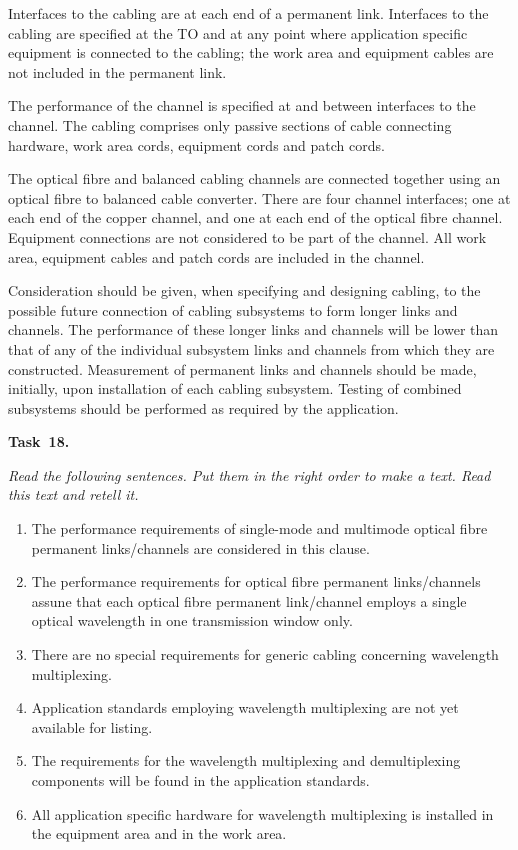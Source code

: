 Interfaces to the cabling are at each end of a permanent link. Interfaces to the cabling are
specified at the TO and at any point where application specific equipment is connected to the
cabling; the work area and equipment cables are not included in the permanent link.\par

The performance of the channel is specified at and between interfaces to the channel. The
cabling comprises only passive sections of cable connecting hardware, work area cords, equipment
cords and patch cords.\par

The optical fibre and balanced cabling channels are connected together using an optical fibre to
balanced cable converter. There are four channel interfaces; one at each end of the copper channel,
and one at each end of the optical fibre channel. Equipment connections are not considered to be
part of the channel. All work area, equipment cables and patch cords are included in the channel.\par

Consideration should be given, when specifying and designing cabling, to the possible future
connection of cabling subsystems to form longer links and channels. The performance of these
longer links and channels will be lower than that of any of the individual subsystem links and
channels from which they are constructed. Measurement of permanent links and channels should be
made, initially, upon installation of each cabling subsystem. Testing of combined subsystems
should be performed as required by the application.\par

{\bf Task~18.}~~{\it Read the following sentences. Put them in the right order to make a text.
Read this text and retell it. \par}

\begin{enumerate}
    \item {The performance requirements of single-mode and multimode optical fibre permanent 
    links/channels are considered in this clause.}
    \item {The performance requirements for optical fibre permanent links/channels assune that
    each optical fibre permanent link/channel employs a single optical wavelength in one
    transmission window only}.
    \item There are no special requirements for generic cabling concerning wavelength multiplexing.
    \item Application standards employing wavelength multiplexing are not yet available for listing.
    \item {The requirements for the wavelength multiplexing and demultiplexing components will
    be found in the application standards}.
    \item {All application specific hardware for wavelength multiplexing is installed in the
    equipment area and in the work area}.
\end{enumerate}

